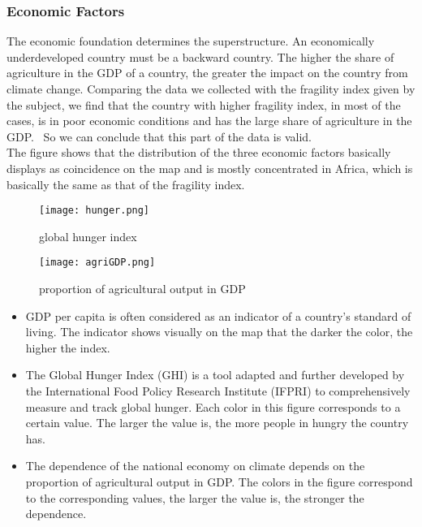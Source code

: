 \documentclass{mcmthesis}
\begin{document}
\subsubsection{Economic Factors}
The economic foundation determines the superstructure. An economically underdeveloped country must be a backward country. The higher the share of agriculture in the GDP of a country, the greater the impact on the country from climate change.
Comparing the data we collected with the fragility index given by the subject, we find that the country with higher fragility index, in most of the cases, is in poor economic conditions and has the large share of agriculture in the GDP.  So we can conclude that this part of the data is valid.\\
The figure shows that the distribution of the three economic factors basically displays as coincidence on the map and is mostly concentrated in Africa, which is basically the same as that of the fragility index.
\begin{figure}[h]
  \centering
  \begin{minipage}[h]{0.48\textwidth}
  \centering
  \texttt{[image: hunger.png]}
  \caption{global hunger index}
  \end{minipage}
  \begin{minipage}[h]{0.48\textwidth}
  \centering
  \texttt{[image: agriGDP.png]}
  \caption{proportion of agricultural output in GDP}
  \end{minipage}
\end{figure}
\begin{itemize}
  \item GDP per capita is often considered as an indicator of a country's standard of living. The indicator shows visually on the map that the darker the color, the higher the index.
  \item The Global Hunger Index (GHI) is a tool adapted and further developed by the International Food Policy Research Institute (IFPRI) to comprehensively measure and track global hunger. Each color in this figure corresponds to a certain value. The larger the value is, the more people in hungry the country has.
  \item The dependence of the national economy on climate depends on the proportion of agricultural output in GDP. The colors in the figure correspond to the corresponding values, the larger the value is, the stronger the dependence.
\end{itemize}
\end{document}
